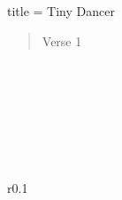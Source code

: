 \begin{song}{title = Tiny Dancer}
\begin{verse}
Verse 1
\end{verse}
 
\begin{bridge}
\end{bridge}

\begin{chorus}
\end{chorus}

\end{song}

\chordC
\chordF
\chordFC
\chordFA
\chordGB
\chordB
\chordEmseven
\\~\\

\chordAmseven
\chordDFsharp
\chordDmseven
\chordEseven
\chordAm
\chordGsevenB
\chordGD
\\~\\

\chordEm
\chordDm
\chordDmsevenF
\chordGseven
\chordAb
\chordBb
\chordGm
\\~\\

\chordCm
\chordCE
\chordGA
\begin{wrapfigure}{r}{0.1\textwidth}
\end{wrapfigure}

